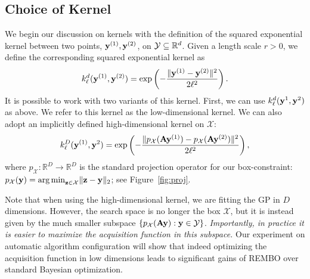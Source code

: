 \documentclass{article}
\begin{document}
\subsection{Choice of Kernel}\label{sec:choice_of_kernel}

We begin our discussion on kernels with the definition of the squared exponential kernel between two points, $\mathbf{y}^{(1)}, \mathbf{y}^{(2)}$, on ${\cal Y} \subseteq \mathbb{R}^d$.
Given a length scale $r > 0$, we define the corresponding {squared exponential} kernel as 
\[ k_{\ell}^d(\mathbf{y}^{(1)},\mathbf{y}^{(2)}) = \exp\left({-\frac{\|\mathbf{y}^{(1)}-\mathbf{y}^{(2)}\|^2}{2\ell^2}}\right). \]
It is possible to work with two variants of this kernel. 
First, we can use $k_{\ell}^d(\mathbf{y}^1, \mathbf{y}^2)$ as above. We refer to this kernel as the low-dimensional kernel. We can also adopt an implicitly defined high-dimensional kernel on 
$\mathcal{X}$:
$$k_{\ell}^D(\mathbf{y}^{(1)}, \mathbf{y}^2) = \exp\left( -\frac{\| p_{\mathcal{X}}(\mathbf{A}\mathbf{y}^{(1)}) - p_{\mathcal{X}}(\mathbf{A}\mathbf{y}^{(2)}) \|^2}{2\ell^2} \right),$$
where $p_{\mathcal{X}}:\mathbb{R}^D \rightarrow \mathbb{R}^D$ is the standard projection operator for our box-constraint: $p_{\mathcal{X}}(\mathbf{y}) = {\arg \min}_{\mathbf{z}\in \mathcal{X}} \|\mathbf{z}-\mathbf{y}\|_2$; see Figure~\ref{fig:proj}. 


Note that when using the high-dimensional kernel, we are fitting the GP in $D$ dimensions. However, the search space is no longer the box $\mathcal{X}$, but it is instead given by the much smaller subspace $\{p_{\mathcal{X}}(\mathbf{A}\mathbf{y}): \mathbf{y} \in {\cal Y} \}$. \emph{Importantly, in practice it is easier to maximize the acquisition function in this subspace.} Our experiment on automatic algorithm configuration will show that indeed optimizing the acquisition function in low dimensions leads to significant gains of REMBO over standard Bayesian optimization.


% 
 
\end{document}
